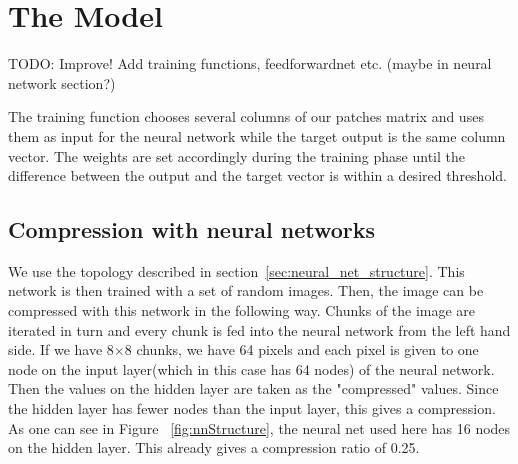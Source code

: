 \section{The Model} \label{sec:model}
{\color{red} TODO: Improve! 
Add training functions, feedforwardnet etc. (maybe in neural network section?)}


The training function chooses several columns of our patches matrix and uses them as input for the neural network while the target output is the same column vector. The weights are set accordingly during the training phase until the difference between the output and the target vector is within a desired threshold.


\subsection{Compression with neural networks}
We use the topology described in section~\ref{sec:neural_net_structure}. This network is then trained with a set of random images. Then, the image can be compressed with this network in the following way. Chunks of the image are iterated in turn and every chunk is fed into the neural network from the left hand side. If we have 8$\times$8 chunks, we have 64 pixels and each pixel is given to one node on the input layer(which in this case has 64 nodes) of the neural network. Then the values on the hidden layer are taken as the "compressed" values. Since the hidden layer has fewer nodes than the input layer, this gives a compression. As one can see in Figure ~\ref{fig:nnStructure}, the neural net used here has 16 nodes on the hidden layer. This already gives a compression ratio of 0.25. 

